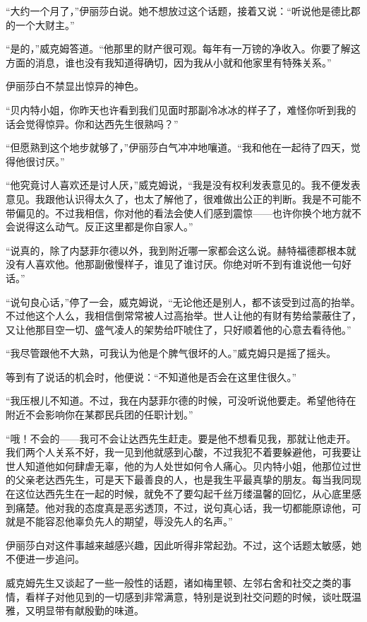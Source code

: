 \par “大约一个月了，”伊丽莎白说。她不想放过这个话题，接着又说：“听说他是德比郡的一个大财主。”
\par “是的，”威克姆答道。“他那里的财产很可观。每年有一万镑的净收入。你要了解这方面的消息，谁也没有我知道得确切，因为我从小就和他家里有特殊关系。”
\par 伊丽莎白不禁显出惊异的神色。
\par “贝内特小姐，你昨天也许看到我们见面时那副冷冰冰的样子了，难怪你听到我的话会觉得惊异。你和达西先生很熟吗？”
\par “但愿熟到这个地步就够了，”伊丽莎白气冲冲地嚷道。“我和他在一起待了四天，觉得他很讨厌。”
\par “他究竟讨人喜欢还是讨人厌，”威克姆说，“我是没有权利发表意见的。我不便发表意见。我跟他认识得太久了，也太了解他了，很难做出公正的判断。我是不可能不带偏见的。不过我相信，你对他的看法会使人们感到震惊——也许你换个地方就不会说得这么动气。反正这里都是你自家人。”
\par “说真的，除了内瑟菲尔德以外，我到附近哪一家都会这么说。赫特福德郡根本就没有人喜欢他。他那副傲慢样子，谁见了谁讨厌。你绝对听不到有谁说他一句好话。”
\par “说句良心话，”停了一会，威克姆说，“无论他还是别人，都不该受到过高的抬举。不过他这个人么，我相信倒常常被人过高抬举。世人让他的有财有势给蒙蔽住了，又让他那目空一切、盛气凌人的架势给吓唬住了，只好顺着他的心意去看待他。”
\par “我尽管跟他不大熟，可我认为他是个脾气很坏的人。”威克姆只是摇了摇头。
\par 等到有了说话的机会时，他便说：“不知道他是否会在这里住很久。”
\par “我压根儿不知道。不过，我在内瑟菲尔德的时候，可没听说他要走。希望他待在附近不会影响你在某郡民兵团的任职计划。”
\par “哦！不会的——我可不会让达西先生赶走。要是他不想看见我，那就让他走开。我们两个人关系不好，我一见到他就感到心酸，不过我犯不着要躲避他，可我要让世人知道他如何肆虐无辜，他的为人处世如何令人痛心。贝内特小姐，他那位过世的父亲老达西先生，可是天下最善良的人，也是我生平最真挚的朋友。每当我同现在这位达西先生在一起的时候，就免不了要勾起千丝万缕温馨的回忆，从心底里感到痛楚。他对我的态度真是恶劣透顶，不过，说句真心话，我一切都能原谅他，可就是不能容忍他辜负先人的期望，辱没先人的名声。”
\par 伊丽莎白对这件事越来越感兴趣，因此听得非常起劲。不过，这个话题太敏感，她不便进一步追问。
\par 威克姆先生又谈起了一些一般性的话题，诸如梅里顿、左邻右舍和社交之类的事情，看样子对他见到的一切感到非常满意，特别是说到社交问题的时候，谈吐既温雅，又明显带有献殷勤的味道。
